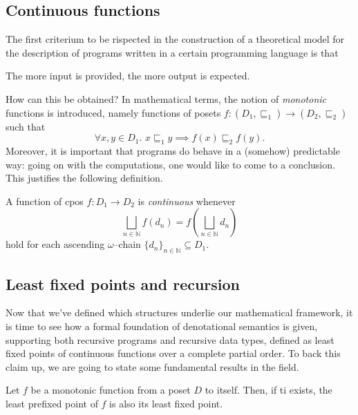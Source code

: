 \subsection[]{Continuous functions}

The first criterium to be rispected in the construction of a theoretical model for the description of programs written in a certain programming language is that
\begin{displayquote}
  The more input is provided, the more output is expected.
\end{displayquote}
How can this be obtained? In mathematical terms, the notion of \emph{monotonic} functions is introduced, namely functions of posets%
\(f \colon (D_1,{}\sqsubseteq_1) \to (D_2,{}\sqsubseteq_2)\) such that
\begin{equation*}
  \forall{}x,y \in D_1.\,\, x \sqsubseteq_1 y \implies f(x) \sqsubseteq_2 f(y).
\end{equation*}
Moreover, it is important that programs do behave in a (somehow) predictable way: going on with the computations, one would like to come to a conclusion.
This justifies the following definition.

\begin{dfn}
  A function of cpos \(f \colon D_1 \to D_2\) is \emph{continuous} whenever
  \begin{equation*}
    \bigsqcup_{n \in \mathbb{N}} f(d_n) = f\left(\bigsqcup_{n\in\mathbb{N}}d_n\right)
  \end{equation*}
  hold for each ascending \(\omega\)--chain \(\lbrace d_n \rbrace_{n \in \mathbb{N}} \subseteq D_1\).
\end{dfn}

\subsection[]{Least fixed points and recursion}

Now that we've defined which structures underlie our mathematical framework, it is time to see how a formal foundation of denotational semantics is given, supporting both recursive programs and recursive data types, defined as least
fixed points of continuous functions over a complete partial order.
To back this claim up, we are going to state some fundamental results in the field.

\begin{lem}\label{lem:cpo-prefixed}
  Let \(f\) be a monotonic function from a poset \(D\) to itself.
  Then, if ti exists, the least prefixed point of \(f\) is also its least fixed point.
\end{lem}


